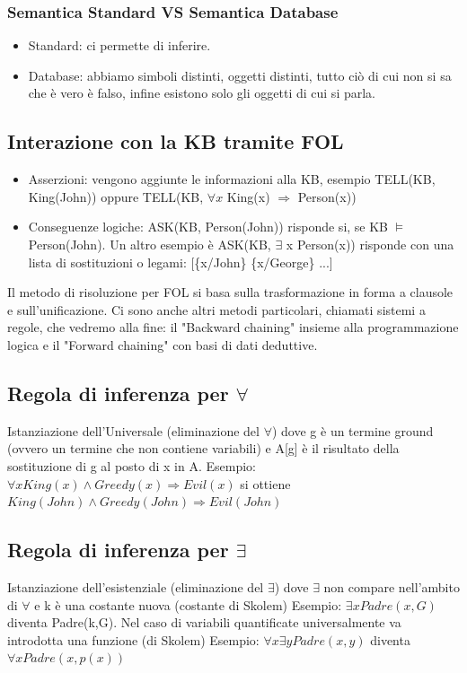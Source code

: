\documentclass{article}
\begin{document}
\subsubsection{Semantica Standard VS Semantica Database}
\begin{itemize}
    \item Standard: ci permette di inferire.
    \item Database: abbiamo simboli distinti, oggetti distinti, tutto ciò di cui non si sa che è vero è falso, infine esistono solo gli oggetti di cui si parla.
\end{itemize}

\subsection{Interazione con la KB tramite FOL}
\begin{itemize}
    \item Asserzioni: vengono aggiunte le informazioni alla KB, esempio TELL(KB, King(John)) oppure TELL(KB, $\forall x$ King(x) $\Rightarrow$ Person(x))
    \item Conseguenze logiche: ASK(KB, Person(John)) risponde si, se KB $\models$ Person(John). Un altro esempio è ASK(KB, $\exists$ x Person(x)) risponde con una lista di sostituzioni o legami: [\{x/John\} \{x/George\} ...]
\end{itemize}
Il metodo di risoluzione per FOL si basa sulla trasformazione in forma a clausole e sull'unificazione. Ci sono anche altri metodi particolari, chiamati sistemi a regole, che vedremo alla fine: il "Backward chaining" insieme alla programmazione logica e il "Forward chaining" con basi di dati deduttive.

\subsection{Regola di inferenza per $\forall$}
Istanziazione dell’Universale (eliminazione del $\forall$) \quad
{} \newline
dove g è un termine ground (ovvero un termine che non contiene variabili) e A[g] è il risultato della sostituzione di g al posto di x in A.\newline
Esempio: $\forall x King(x) \land Greedy(x) \Rightarrow Evil(x)$ si ottiene $ King(John) \land Greedy(John) \Rightarrow Evil(John)$

\subsection{Regola di inferenza per $\exists$}
Istanziazione dell'esistenziale (eliminazione del $\exists$) \quad 
{} \newline
dove $\exists$ non compare nell'ambito di $\forall$ e k è una costante nuova (costante di Skolem) \newline
Esempio: $\exists x Padre(x,G)$ diventa Padre(k,G). \newline
Nel caso di variabili quantificate universalmente va introdotta una funzione (di Skolem) \newline
Esempio: $\forall x \exists y Padre(x, y)$ diventa $\forall x Padre(x, p(x))$
\end{document}
